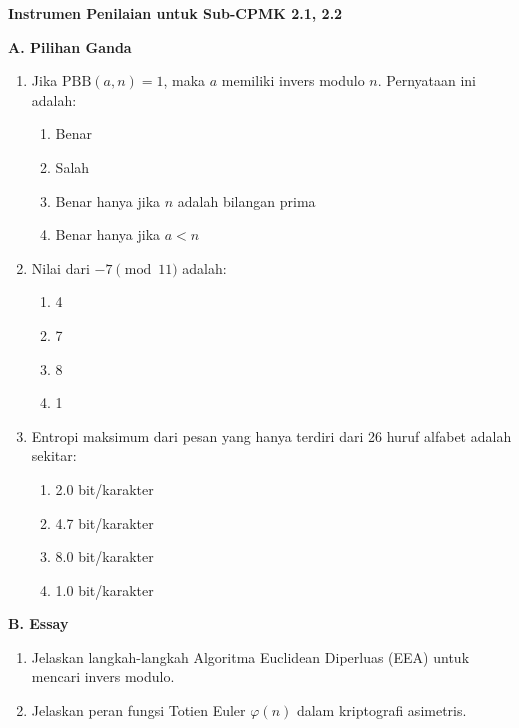 \documentclass[main.tex]{subfiles}
\begin{document}
\begin{asesmen}
\textbf{Instrumen Penilaian untuk Sub-CPMK 2.1, 2.2}

\textbf{A. Pilihan Ganda}

\begin{enumerate}
  \item Jika $\text{PBB}(a, n) = 1$, maka $a$ memiliki invers modulo $n$. Pernyataan ini adalah:
  \begin{enumerate}
    \item Benar
    \item Salah
    \item Benar hanya jika $n$ adalah bilangan prima
    \item Benar hanya jika $a < n$
  \end{enumerate}

  \item Nilai dari $-7 \pmod{11}$ adalah:
  \begin{enumerate}
    \item 4
    \item 7
    \item 8
    \item 1
  \end{enumerate}

  \item Entropi maksimum dari pesan yang hanya terdiri dari 26 huruf alfabet adalah sekitar:
  \begin{enumerate}
    \item 2.0 bit/karakter
    \item 4.7 bit/karakter
    \item 8.0 bit/karakter
    \item 1.0 bit/karakter
  \end{enumerate}
\end{enumerate}

\textbf{B. Essay}

\begin{enumerate}
  \item Jelaskan langkah-langkah Algoritma Euclidean Diperluas (EEA) untuk mencari invers modulo.
  \item Jelaskan peran fungsi Totien Euler $\varphi(n)$ dalam kriptografi asimetris.
\end{enumerate}
\end{asesmen}

\end{document}
